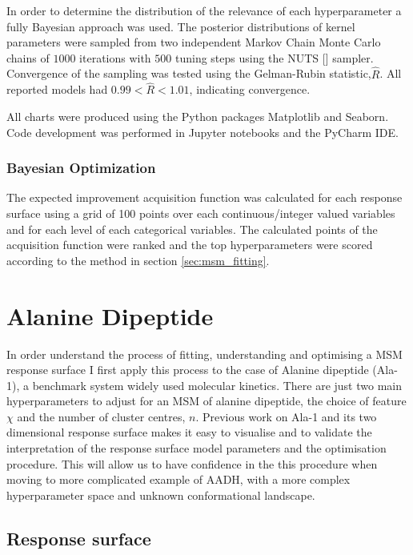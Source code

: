In order to determine the distribution of the relevance of each hyperparameter a fully Bayesian approach was used. The posterior distributions of kernel parameters were sampled from two independent Markov Chain Monte Carlo chains of $1000$ iterations with $500$ tuning steps using the NUTS [] sampler. Convergence of the sampling was tested using the Gelman-Rubin statistic,$\hat{R}$. All reported models had   $0.99<\hat{R}<1.01$, indicating convergence. 

All charts were produced using the Python packages Matplotlib and Seaborn. Code development was performed in Jupyter notebooks and the PyCharm IDE. 

\subsubsection{Bayesian Optimization}

The expected improvement acquisition function was calculated for each response surface using a grid of 100 points over each continuous/integer valued variables and for each level of each categorical variables. The calculated points of the acquisition function were ranked and the top hyperparameters were scored according to the method in section \ref{sec:msm_fitting}. 



\section{Alanine Dipeptide}


In order understand the process of fitting, understanding and optimising a MSM response surface I first apply this process to the case of Alanine dipeptide (Ala-1), a benchmark system widely used molecular kinetics. There are just two main hyperparameters to adjust for an MSM of alanine dipeptide, the choice of feature $\chi$ and the number of cluster centres, $n$. Previous work on Ala-1 and its two dimensional response surface makes it easy to visualise and to validate the interpretation of the response surface model parameters and the optimisation procedure. This will allow us to have confidence in the this procedure when moving to more complicated example of AADH, with a more complex hyperparameter space and unknown conformational landscape.

\subsection{Response surface}

